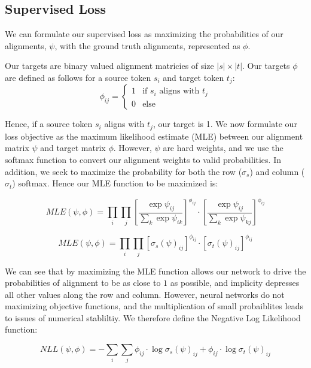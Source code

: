 \documentclass[twoside,twocolumn]{article}
\begin{document}
\subsection{Supervised Loss}
We can formulate our supervised loss as maximizing the probabilities
of our alignments, $\psi$, with the ground truth alignments,
represented as $\phi$.

Our targets are binary valued alignment matricies of size $|s| \times |t|$.
Our targets $\phi$ are defined as follows for a source token $s_i$ and
target token $t_j$:
\begin{equation}
  \phi_{ij} = \begin{cases}
  1 & \text{if } s_i \text{ aligns with } t_j \\
  0 & \text{else}
  \end{cases}
\end{equation}

Hence, if a source token $s_i$ aligns with $t_j$, our target is 1.
We now formulate our loss objective as the maximum likelihood estimate (MLE)
between our alignment matrix $\psi$ and target matrix $\phi$.
However, $\psi$ are hard weights, and we use the softmax function to
convert our alignment weights to valid probabilities. In addition, we
seek to maximize the probability for both the row ($\sigma_s$) and
column ($\sigma_t$) softmax. Hence our MLE function to be maximized is:

\begin{equation}
  MLE(\psi, \phi) = \prod_i \prod_j \left[ \frac{\exp \psi_{ij}}{\sum_k \exp \psi_{ik}} \right]^{\phi_{ij}} \cdot \left[ \frac{\exp \psi_{ij}}{\sum_k \exp \psi_{kj}} \right]^{\phi_{ij}}
\end{equation}


\begin{equation}
  MLE(\psi, \phi) = \prod_i \prod_j \left[ \sigma_s(\psi)_{ij} \right]^{\phi_{ij}} \cdot \left[ \sigma_t(\psi)_{ij} \right]^{\phi_{ij}}
\end{equation}

We can see that by maximizing the MLE function allows our network to
drive the probabilities of alignment to be as close to $1$ as possible,
and implicity depresses all other values along the row and column.
However, neural networks do not maximizing objective functions, and
the multiplication of small probaiblites leads to issues of numerical
stabliltiy. We therefore define the Negative Log Likelihood function:

\begin{equation}
  NLL(\psi, \phi) = - \sum_i \sum_j  \phi_{ij} \cdot \log \sigma_s (\psi)_{ij} + \phi_{ij} \cdot \log \sigma_t (\psi)_{ij}
\end{equation}
\end{document}
